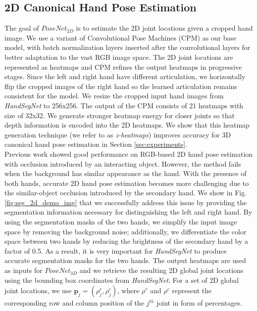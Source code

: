 \documentclass[10pt,twocolumn,letterpaper]{article}
\begin{document}
\subsection{2D Canonical Hand Pose Estimation}\label{sec:2D}
\indent The goal of \textit{$PoseNet_{2D}$} is to estimate the 2D joint locations given a cropped hand image. We use a variant of Convolutional Pose Machines (CPM) \cite{Wei} as our base model, with batch normalization layers inserted after the convolutional layers for better adaptation to the vast RGB image space. The 2D joint locations are represented as heatmaps and CPM refines the output heatmaps in progressive stages. Since the left and right hand have different articulation, we horizontally flip the cropped images of the right hand so the learned articulation remains consistent for the model. We resize the cropped input hand images from \textit{HandSegNet} to 256x256. The output of the CPM consists of 21 heatmaps with size of 32x32. We generate stronger heatmap energy for closer joints so that depth information is encoded into the 2D heatmaps. We show that this heatmap generation technique (we refer to as \textit{z-heatmaps}) improves accuracy for 3D canonical hand pose estimation in Section \ref{sec:experiments}.\\
\indent Previous work \cite{Mueller} showed good performance on RGB-based 2D hand pose estimation with occlusion introduced by an interacting object. However, the method fails when the background has similar appearance as the hand. With the presence of both hands, accurate 2D hand pose estimation becomes more challenging due to the similar-object occlusion introduced by the secondary hand. We show in Fig. \ref{fig:seg_2d_demo_img} that we successfully address this issue by providing the segmentation information necessary for distinguishing the left and right hand. By using the segmentation masks of the two hands, we simplify the input image space by removing the background noise; additionally, we differentiate the color space between two hands by reducing the brightness of the secondary hand by a factor of 0.5. As a result, it is very important for \textit{HandSegNet} to produce accurate segmentation masks for the two hands. The output heatmaps are used as inputs for \textit{$PoseNet_{3D}$} and we retrieve the resulting 2D global joint locations using the bounding box coordinates from \textit{HandSegNet}. For a set of 2D global joint locations, we use $\textbf{p}_{j} = (\rho^{r}_{j}, \rho^{c}_{j})$, where $\rho^{r}$ and $\rho^{c}$ represent the corresponding row and column position of the $j^{th}$ joint in form of percentages.
\end{document}
